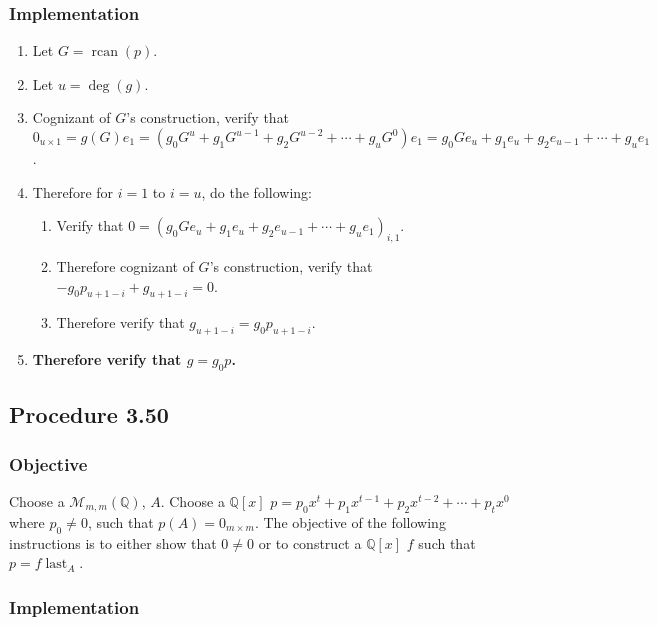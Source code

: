 \documentclass[twocolumn]{article}
\DeclareMathOperator{\rcan}{rcan}
\DeclareMathOperator{\last}{last}
\newcommand{\procedure}[2][]{\subsection*{Procedure #2 \ifthenelse{\equal{#1}{}}{}{(#1)}}\label{sec:procedure #2}}
\newcommand{\objective}{\subsubsection*{Objective}}
\newcommand{\implementation}{\subsubsection*{Implementation}}
\begin{document}
			\implementation
				\begin{enumerate}
					\item Let $G=\rcan(p)$.
					\item Let $u=\deg(g)$.
					\item Cognizant of $G$'s construction, verify that $0_{u\times 1}=g(G)e_1=(g_0G^u+g_1G^{u-1}+g_2G^{u-2}+\cdots+g_uG^0)e_1=g_0Ge_u+g_1e_u+g_2e_{u-1}+\cdots+g_ue_1$.
					\item Therefore for $i=1$ to $i=u$, do the following:
					\begin{enumerate}
						\item Verify that $0=(g_0Ge_u+g_1e_u+g_2e_{u-1}+\cdots+g_ue_1)_{i,1}$.
						\item Therefore cognizant of $G$'s construction, verify that $-g_0p_{u+1-i}+g_{u+1-i}=0$.
						\item Therefore verify that $g_{u+1-i}=g_0p_{u+1-i}$.
					\end{enumerate}
					\item \textbf{Therefore verify that $g=g_0p$.}
				\end{enumerate}
		\procedure{3.50}
			\objective
				Choose a $\mathcal{M}_{m,m}(\mathbb{Q})$, $A$. Choose a $\mathbb{Q}[x]$ $p=p_0x^t+p_1x^{t-1}+p_2x^{t-2}+\cdots+p_tx^0$ where $p_0\ne 0$, such that $p(A)=0_{m\times m}$. The objective of the following instructions is to either show that $0\ne 0$ or to construct a $\mathbb{Q}[x]$ $f$ such that $p=f\last_A$.
			\implementation
\end{document}
